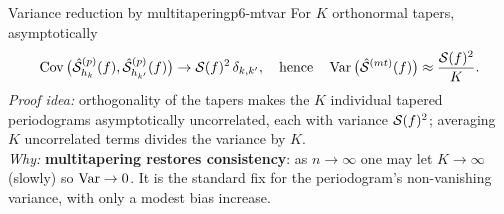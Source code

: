 \begin{theorem}{Variance reduction by multitapering}{p6-mtvar}
For $K$ orthonormal tapers, asymptotically
\[
\operatorname{Cov}\big(\hat{\mathcal{S}}^{(p)}_{h_k}(f),\hat{\mathcal{S}}^{(p)}_{h_{k'}}(f)\big)
\to\mathcal{S}(f)^2\,\delta_{k,k'},
\quad\text{hence}\quad
\operatorname{Var}\big(\hat{\mathcal{S}}^{(mt)}(f)\big)\approx\frac{\mathcal{S}(f)^2}{K}.
\]
\textit{Proof idea:} orthogonality of the tapers makes the $K$ individual
tapered periodograms asymptotically uncorrelated, each with variance
$\mathcal{S}(f)^2$; averaging $K$ uncorrelated terms divides the variance by $K$.\\
\textit{Why:} \textbf{multitapering restores consistency}: as $n\to\infty$ one
may let $K\to\infty$ (slowly) so $\operatorname{Var}\to0$. It is the standard fix for the
periodogram's non-vanishing variance, with only a modest bias increase.
\end{theorem}




